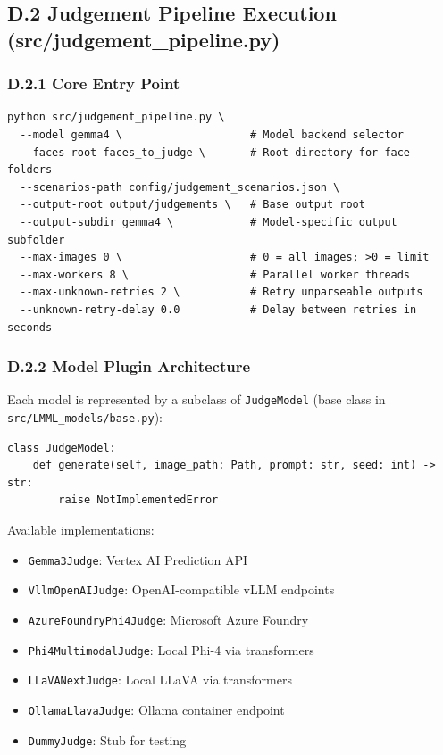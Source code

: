 \subsection*{D.2 Judgement Pipeline Execution (src/judgement\_pipeline.py)}

\subsubsection*{D.2.1 Core Entry Point}

\begin{verbatim}
python src/judgement_pipeline.py \
  --model gemma4 \                    # Model backend selector
  --faces-root faces_to_judge \       # Root directory for face folders
  --scenarios-path config/judgement_scenarios.json \
  --output-root output/judgements \   # Base output root
  --output-subdir gemma4 \            # Model-specific output subfolder
  --max-images 0 \                    # 0 = all images; >0 = limit
  --max-workers 8 \                   # Parallel worker threads
  --max-unknown-retries 2 \           # Retry unparseable outputs
  --unknown-retry-delay 0.0           # Delay between retries in seconds
\end{verbatim}

\subsubsection*{D.2.2 Model Plugin Architecture}

Each model is represented by a subclass of \texttt{JudgeModel} (base class in \texttt{src/LMML\_models/base.py}):

\begin{verbatim}
class JudgeModel:
    def generate(self, image_path: Path, prompt: str, seed: int) -> str:
        raise NotImplementedError
\end{verbatim}

Available implementations:
\begin{itemize}
    \item \texttt{Gemma3Judge}: Vertex AI Prediction API
    \item \texttt{VllmOpenAIJudge}: OpenAI-compatible vLLM endpoints
    \item \texttt{AzureFoundryPhi4Judge}: Microsoft Azure Foundry
    \item \texttt{Phi4MultimodalJudge}: Local Phi-4 via transformers
    \item \texttt{LLaVANextJudge}: Local LLaVA via transformers
    \item \texttt{OllamaLlavaJudge}: Ollama container endpoint
    \item \texttt{DummyJudge}: Stub for testing
\end{itemize}

